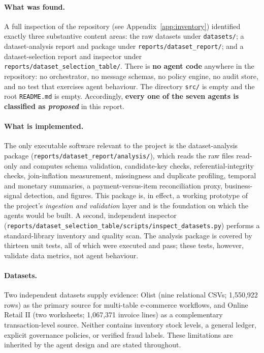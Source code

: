 \documentclass[11pt,a4paper]{article}
\newcommand{\code}[1]{\texttt{#1}}
\begin{document}
\paragraph{What was found.} A full inspection of the repository (see Appendix~\ref{app:inventory}) identified exactly three substantive content areas: the raw datasets under \code{datasets/}; a dataset-analysis report and package under \code{reports/dataset\_report/}; and a dataset-selection report and inspector under \code{reports/dataset\_selection\_table/}. There is \textbf{no agent code} anywhere in the repository: no orchestrator, no message schemas, no policy engine, no audit store, and no test that exercises agent behaviour. The directory \code{src/} is empty and the root \code{README.md} is empty. Accordingly, \textbf{every one of the seven agents is classified as \emph{proposed}} in this report.

\paragraph{What is implemented.} The only executable software relevant to the project is the dataset-analysis package (\code{reports/dataset\_report/analysis/}), which reads the raw files read-only and computes schema validation, candidate-key checks, referential-integrity checks, join-inflation measurement, missingness and duplicate profiling, temporal and monetary summaries, a payment-versus-item reconciliation proxy, business-signal detection, and figures. This package is, in effect, a working prototype of the project's \emph{ingestion and validation} layer and is the foundation on which the agents would be built. A second, independent inspector (\code{reports/dataset\_selection\_table/scripts/inspect\_datasets.py}) performs a standard-library inventory and quality scan. The analysis package is covered by thirteen unit tests, all of which were executed and pass; these tests, however, validate data metrics, not agent behaviour.

\paragraph{Datasets.} Two independent datasets supply evidence: Olist (nine relational CSVs; 1{,}550{,}922 rows) as the primary source for multi-table e-commerce workflows, and Online Retail II (two worksheets; 1{,}067{,}371 invoice lines) as a complementary transaction-level source. Neither contains inventory stock levels, a general ledger, explicit governance policies, or verified fraud labels. These limitations are inherited by the agent design and are stated throughout.
\end{document}
